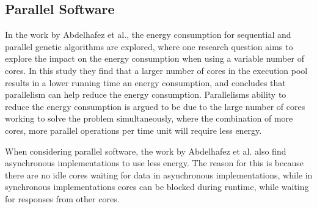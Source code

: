 \subsection{Parallel Software}

In the work by Abdelhafez et al.\cite{abdelhafez2019}, the energy consumption for sequential and parallel genetic algorithms are explored, where one research question aims to explore the impact on the energy consumption when using a variable number of cores. In this study they find that a larger number of cores in the execution pool results in a lower running time an energy consumption, and concludes that parallelism can help reduce the energy consumption. Parallelisms ability to reduce the energy consumption is argued to be due to the large number of cores working to solve the problem simultaneously, where the combination of more cores, more parallel operations per time unit will require less energy.

When considering parallel software, the work by Abdelhafez et al.\cite{abdelhafez2019} also find asynchronous implementations to use less energy. The reason for this is because there are no idle cores waiting for data in asynchronous implementations, while in synchronous implementations cores can be blocked during runtime, while waiting for responses from other cores. 

